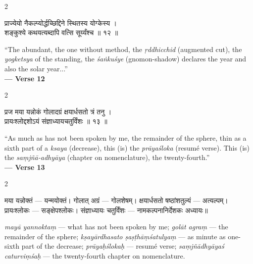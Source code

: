 \documentclass[11pt,a4paper]{article}
\newcommand{\dev}[1]{{\devanagarifont #1}}
\newenvironment{bilingualverse}{%
  \begin{paracol}{2}
  \fontsize{10.5}{13}\selectfont
}{%
  \end{paracol}
  \vspace{0.3cm}
}
\begin{document}
\begin{bilingualverse}
\begin{leftcolumn*}
\dev{प्राज्येयो नैकल्प्योर्द्धच्छिद्दिने स्थितस्य योग्केस्य ।}\\
\dev{शङ्कुश्ये कथयत्यब्दापि वत्सि सूर्य्यंश्च ॥ १२ ॥}
\end{leftcolumn*}
\begin{rightcolumn}
``The abundant, the one without method, the \textit{ṛddhicchid} (augmented cut), the \textit{yogketsya} of the standing, the \textit{śaṅkuśye} (gnomon-shadow) declares the year and also the solar year...''\\[0.3cm]
\hfill\textbf{— Verse 12}
\end{rightcolumn}
\end{bilingualverse}

\begin{bilingualverse}
\begin{leftcolumn*}
\dev{प्रज मया यन्नोकं गोलादग्रं क्षयार्धसतो त्रं तनु ।}\\
\dev{प्रायःश्लोद्दशोऽयं संज्ञाध्यायचतुर्विंशः ॥ १३ ॥}
\end{leftcolumn*}
\begin{rightcolumn}
``As much as has not been spoken by me, the remainder of the sphere, thin as a sixth part of a \textit{ksaya} (decrease), this (is) the \textit{prāyaśloka} (resumé verse). This (is) the \textit{saṃjñā-adhyāya} (chapter on nomenclature), the twenty-fourth.''\\[0.3cm]
\hfill\textbf{— Verse 13}
\end{rightcolumn}
\end{bilingualverse}

\begin{paracol}{2}
\begin{leftcolumn*}
\dev{मया यन्नोक्तं} — यन्मयोक्तं। \dev{गोलात् अग्रं} — गोलशेषम्। \dev{क्षयार्धसतो षष्ठांशतुल्यं} — अत्यल्पम्। \dev{प्रायःश्लोकः} — सङ्क्षेपश्लोकः। \dev{संज्ञाध्यायः चतुर्विंशः} — नामकल्पनानिर्देशकः अध्यायः॥
\end{leftcolumn*}
\begin{rightcolumn}
\textit{mayā yannoktaṃ} --- what has not been spoken by me; \textit{golāt agraṃ} --- the remainder of the sphere; \textit{kṣayārdhasato ṣaṣṭhāṃśatulyaṃ} --- as minute as one-sixth part of the decrease; \textit{prāyaḥślokaḥ} --- resumé verse; \textit{saṃjñādhyāyaś caturviṃśaḥ} --- the twenty-fourth chapter on nomenclature.
\end{rightcolumn}
\end{paracol}
\end{document}
